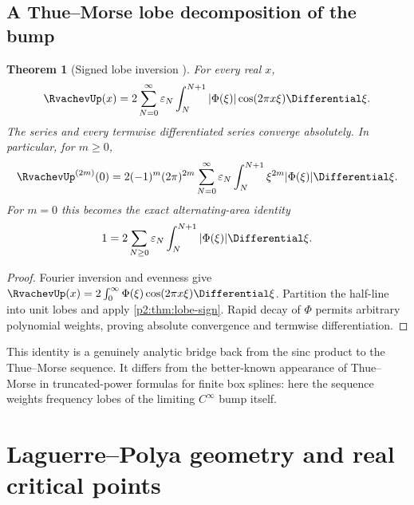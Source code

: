 \documentclass[11pt]{article}
\numberwithin{equation}{section}
\newtheorem{theorem}{Theorem}[section]
\theoremstyle{definition}
\theoremstyle{remark}
\begin{document}
\subsection{A Thue--Morse lobe decomposition of the bump}

\begin{theorem}[Signed lobe inversion \NewResult]
\label{p2:thm:lobe-inversion}
For every real $x$,
\begin{equation}
 \RvachevUp(x)=2\sum_{N=0}^{\infty}\varepsilon_N
 \int_N^{N+1}|\Phi(\xi)|\cos(2\pi x\xi)\Differential\xi.             \label{p2:eq:lobe-inversion}
\end{equation}
The series and every termwise differentiated series converge absolutely.  In
particular, for $m\ge0$,
\begin{equation}
 \RvachevUp^{(2m)}(0)=2(-1)^m(2\pi)^{2m}
 \sum_{N=0}^{\infty}\varepsilon_N
 \int_N^{N+1}\xi^{2m}|\Phi(\xi)|\Differential\xi.                  \label{p2:eq:lobe-moments}
\end{equation}
For $m=0$ this becomes the exact alternating-area identity
\begin{equation}
 1=2\sum_{N\ge0}\varepsilon_N\int_N^{N+1}|\Phi(\xi)|\Differential\xi.                \label{p2:eq:area}
\end{equation}
\end{theorem}

\begin{proof}
Fourier inversion and evenness give
$\RvachevUp(x)=2\int_0^\infty\Phi(\xi)\cos(2\pi x\xi)\Differential\xi$.
Partition the half-line into unit lobes and apply \cref{p2:thm:lobe-sign}.
Rapid decay of $\Phi$ permits arbitrary polynomial weights, proving absolute
convergence and termwise differentiation.
\end{proof}

This identity is a genuinely analytic bridge back from the sinc product to the
Thue--Morse sequence.  It differs from the better-known appearance of
Thue--Morse in truncated-power formulas for finite box splines: here the sequence
weights frequency lobes of the limiting $C^\infty$ bump itself.

\section{Laguerre--Polya geometry and real critical points}
\label{p2:sec:LP}
\end{document}
